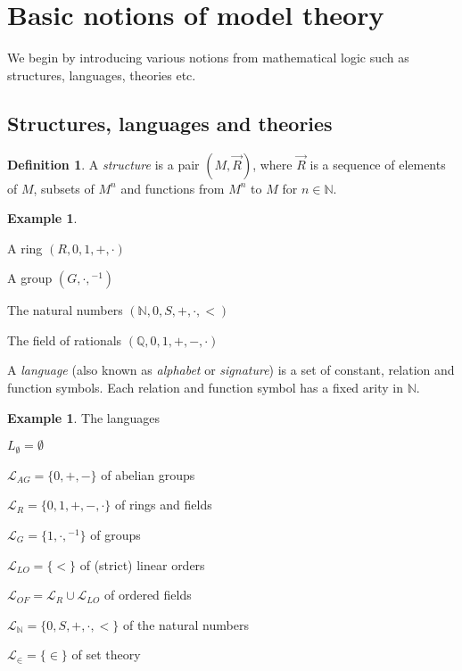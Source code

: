 \documentclass[10pt]{amsart}
\renewcommand{\L}{\mathcal{L}}
\newcommand{\QQ}{\mathbb{Q}}
\newcommand{\NNN}{\mathbb{N}}
\theoremstyle{definition}
\newtheorem{definition}[theorem]{Definition}
\newtheorem{example}[theorem]{Example}
\theoremstyle{remark}
\newenvironment{enumerate-(a)}{\begin{enumerate}[label={\upshape (\alph*)}, leftmargin=2pc]}{\end{enumerate}}
\begin{document}
\section{Basic notions of model theory} 

We begin by introducing various notions from mathematical logic such as structures, languages, theories etc. 

\subsection{Structures, languages and theories} 

\begin{definition} 
A \emph{structure} is a pair $(M,\vec{R})$, where $\vec{R}$ is a sequence of elements of $M$, subsets of $M^n$ and functions from $M^n$ to $M$ for $n\in\NNN$. 
\end{definition} 

\begin{example} 
\begin{enumerate-(a)} 
\item 
A ring $(R,0,1,+,\cdot)$ 
\item 
A group $(G,\cdot,{}^{-1})$ 
\item 
The natural numbers $(\NNN,0,S,+,\cdot,<)$ 
\item 
The field of rationals $(\QQ,0,1,+,-,\cdot)$ 
\end{enumerate-(a)} 
\end{example} 

A \emph{language} (also known as \emph{alphabet} or \emph{signature}) is a set of constant, relation and function symbols. Each relation and function symbol has a fixed arity in $\NNN$. 

\begin{example} 
The languages 
\begin{enumerate-(a)} 
\item 
$L_{\emptyset}=\emptyset$ 
\item 
$\L_{AG}=\{0,+,-\}$ of abelian groups 
\item 
$\L_R=\{0,1,+,-,\cdot\}$ of rings and fields 
\item 
$\L_G=\{1,\cdot,{}^{-1}\}$ of groups 
\item 
$\L_{LO}=\{<\}$ of (strict) linear orders 
\item 
$\L_{OF}=\L_R\cup \L_{LO}$ of ordered fields 
\item 
$\L_{\NNN}=\{0,S,+,\cdot,<\}$ of the natural numbers 
\item 
$\L_{\in}=\{\in\}$ of set theory 
\end{enumerate-(a)} 
\end{example} 
\end{document}

